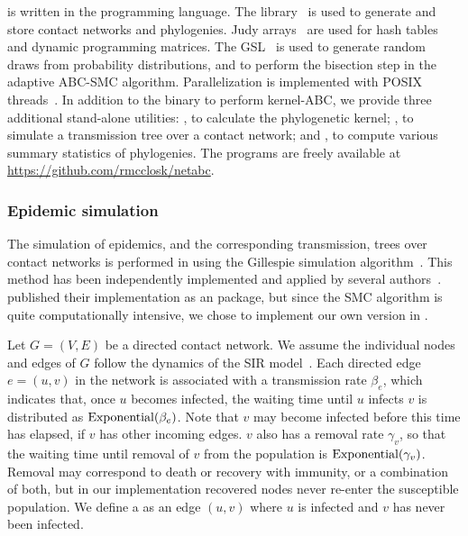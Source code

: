  is written in the  programming language. The
 library~\autocite{csardi2006igraph} is used to generate and
store contact networks and phylogenies. Judy arrays~\autocite{baskins2004judy}
are used for hash tables and dynamic programming matrices. The
\gls{GSL}~\autocite{gough2009gnu} is used to generate random draws from
probability distributions, and to perform the bisection step in the adaptive
\gls{ABC}-\gls{SMC} algorithm. Parallelization is implemented with POSIX
threads~\autocite{barney2009posix}. In addition to the  binary
to perform kernel-\gls{ABC}, we provide three additional stand-alone utilities:
, to calculate the phylogenetic kernel;
, to simulate a transmission tree over a contact network; and
, to compute various summary statistics of phylogenies. The
programs are freely available at \url{https://github.com/rmcclosk/netabc}.

\subsubsection*{Epidemic simulation}
\label{subsubsec:nettree}

The simulation of epidemics, and the corresponding transmission, trees over
contact networks is performed in  using the Gillespie
simulation algorithm~\autocite{gillespie1976general}. This method has been
independently implemented and applied by several
authors~\autocite[\textit{e.g.}][]{o2011contact, robinson2013dynamics,
leventhal2012inferring, groendyke2011bayesian, villandre2016assessment}.
\textcite{groendyke2011bayesian} published their implementation as an
 package, but since the \gls{SMC} algorithm is quite
computationally intensive, we chose to implement our own version in
.

Let $G = (V, E)$ be a directed contact network. We assume the individual nodes
and edges of $G$ follow the dynamics of the \gls{SIR}
model~\autocite{kermack1927contribution}. Each directed edge $e = (u, v)$ in
the network is associated with a transmission rate $\beta_e$, which indicates
that, once $u$ becomes infected, the waiting time until $u$ infects $v$ is
distributed as $\operatorname{Exponential}(\beta_e)$. Note that $v$ may become infected
before this time has elapsed, if $v$ has other incoming edges. $v$ also has a
removal rate $\gamma_v$, so that the waiting time until removal of $v$ from the
population is $\operatorname{Exponential}(\gamma_v)$. Removal may correspond to death or
recovery with immunity, or a combination of both, but in our implementation
recovered nodes never re-enter the susceptible population. We define a
 as an edge $(u, v)$ where $u$ is infected and $v$ has
never been infected.

